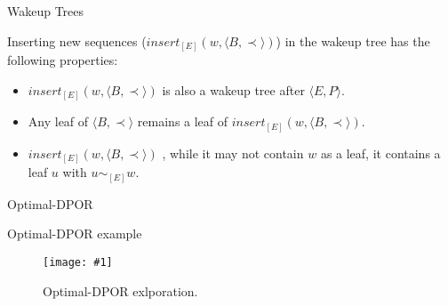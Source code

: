 \documentclass[9pt]{beamer}
\newcommand{\tracelong}[2]{
\begin{figure}[H]
\centering
\texttt{[image: \#1]}
\caption{#2}
\label{#2}
\end{figure}
}
\begin{document}
\begin{frame} {Wakeup Trees}

Inserting new sequences ($insert_{[E]}(w,\langle B , \prec \rangle)$) in the wakeup tree has the following properties:

\begin{itemize}[<+->]

    \item $insert_{[E]}(w,\langle B , \prec \rangle)$ is also a wakeup tree after $\langle E , P \rangle$.
    \item Any leaf of $\langle B , \prec \rangle$ remains a leaf of $insert_{[E]}(w,\langle B , \prec \rangle)$.
    \item $insert_{[E]}(w,\langle B , \prec \rangle)$ , while it may not contain $w$ as a leaf, it contains a  leaf $u$ with $u \sim_{[E]} w$. 

\end{itemize}


\end{frame}


\begin{frame} [shrink=28]{Optimal-DPOR}

\begin{algorithm}[H]
    \caption{Optimal-DPOR}
    \label{optimal}
\end{algorithm}
\end{frame}


\begin{frame} {Optimal-DPOR example}
\tracelong{../img/opt_seq/11.png}{Optimal-DPOR exlporation.}
\end{frame}
\end{document}
